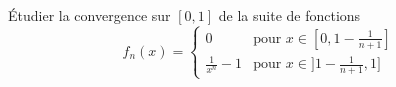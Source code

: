 

\begin{exercice}\label{exo119}

Étudier la convergence sur $[0,1]$ de la suite de fonctions
\begin{equation}
	f_n(x)=
\begin{cases}
	0	&	\text{pour }x\in[0,1-\frac{ 1 }{ n+1 }]\\
	\frac{1}{ x^n }-1	&	 \text{pour }x\in]1-\frac{1}{ n+1 },1]
\end{cases}
\end{equation}

\end{exercice}
